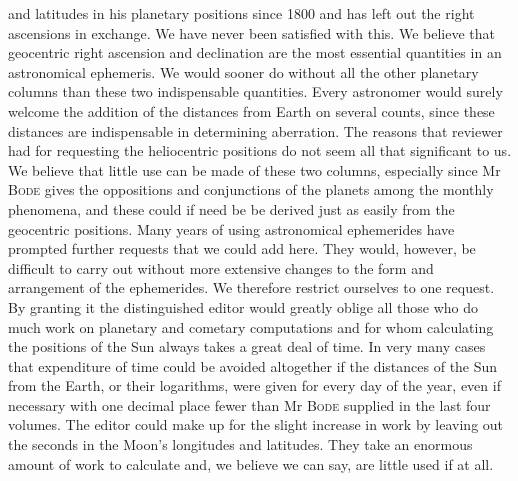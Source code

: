 and latitudes in his planetary positions since 1800 and has left out the right ascensions in exchange. We have never been satisfied with this. We believe that geocentric right ascension and declination are the most essential quantities in an astronomical ephemeris. We would sooner do without all the other planetary columns than these two indispensable quantities. Every astronomer would surely welcome the addition of the distances from Earth on several counts, since these distances are indispensable in determining aberration. The reasons that reviewer had for requesting the heliocentric positions do not seem all that significant to us. We believe that little use can be made of these two columns, especially since Mr \textsc{Bode} gives the oppositions and conjunctions of the planets among the monthly phenomena, and these could if need be be derived just as easily from the geocentric positions. Many years of using astronomical ephemerides have prompted further requests that we could add here. They would, however, be difficult to carry out without more extensive changes to the form and arrangement of the ephemerides. We therefore restrict ourselves to one request. By granting it the distinguished editor would greatly oblige all those who do much work on planetary and cometary computations and for whom calculating the positions of the Sun always takes a great deal of time. In very many cases that expenditure of time could be avoided altogether if the distances of the Sun from the Earth, or their logarithms, were given for every day of the year, even if necessary with one decimal place fewer than Mr \textsc{Bode} supplied in the last four volumes. The editor could make up for the slight increase in work by leaving out the seconds in the Moon’s longitudes and latitudes. They take an enormous amount of work to calculate and, we believe we can say, are little used if at all.

